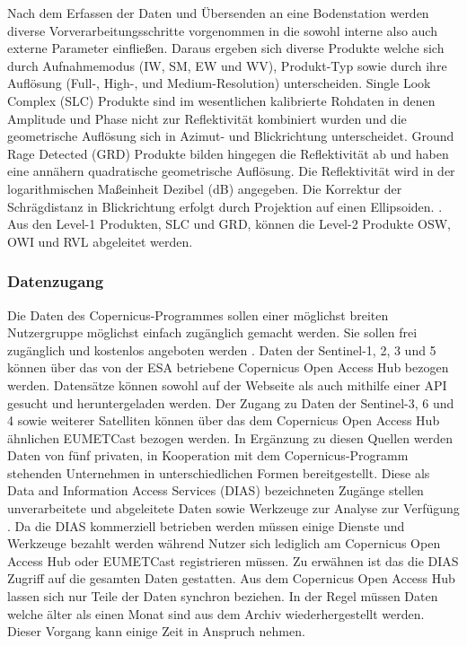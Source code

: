 Nach dem Erfassen der Daten und Übersenden an eine Bodenstation werden diverse Vorverarbeitungsschritte vorgenommen in die sowohl interne also auch externe
Parameter einfließen. Daraus ergeben sich diverse Produkte welche sich durch Aufnahmemodus (IW, SM, EW und WV), Produkt-Typ sowie durch ihre 
Auflösung (Full-, High-, und Medium-Resolution) unterscheiden. Single Look Complex (SLC) Produkte sind im wesentlichen kalibrierte Rohdaten in denen Amplitude und Phase nicht
zur Reflektivität kombiniert wurden und die geometrische Auflösung sich in Azimut- und Blickrichtung unterscheidet. Ground Rage Detected (GRD) Produkte bilden hingegen die 
Reflektivität ab und haben eine annähern quadratische geometrische Auflösung. Die Reflektivität wird in der logarithmischen Maßeinheit Dezibel (dB) angegeben. Die Korrektur 
der Schrägdistanz in Blickrichtung erfolgt durch Projektion auf einen Ellipsoiden. \cite{sentinel_1_definition}. Aus den Level-1 Produkten, SLC und GRD, können die 
Level-2 Produkte OSW, OWI und RVL abgeleitet werden.

\subsubsection{Datenzugang}
Die Daten des Copernicus-Programmes sollen einer möglichst breiten Nutzergruppe möglichst einfach zugänglich gemacht werden. Sie sollen frei zugänglich und kostenlos angeboten 
werden \cite{copernicus_regulation}. Daten der Sentinel-1, 2, 3 und 5 können über das von der ESA betriebene Copernicus Open Access Hub bezogen werden. Datensätze können sowohl
auf der Webseite als auch mithilfe einer API gesucht und heruntergeladen werden. Der Zugang zu Daten der Sentinel-3, 6 und 4 sowie weiterer Satelliten können über das 
dem Copernicus Open Access Hub ähnlichen EUMETCast bezogen werden.
In Ergänzung zu diesen Quellen werden Daten von fünf privaten, in Kooperation mit dem Copernicus-Programm stehenden Unternehmen in unterschiedlichen Formen bereitgestellt. 
Diese als Data and Information Access Services (DIAS) bezeichneten Zugänge stellen unverarbeitete und abgeleitete Daten sowie Werkzeuge zur Analyse zur Verfügung \cite{dias_factsheet}.
Da die DIAS kommerziell betrieben werden müssen einige Dienste und Werkzeuge bezahlt werden während Nutzer sich lediglich am Copernicus Open Access Hub oder EUMETCast 
registrieren müssen. Zu erwähnen ist das die DIAS Zugriff auf die gesamten Daten gestatten. Aus dem Copernicus Open Access Hub lassen sich nur Teile der Daten synchron beziehen.
In der Regel müssen Daten welche älter als einen Monat sind aus dem Archiv wiederhergestellt werden. Dieser Vorgang kann einige Zeit in Anspruch nehmen. 

